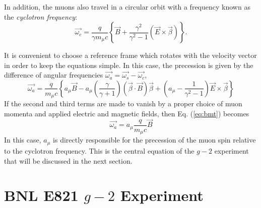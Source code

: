 \documentclass{outhesis}
\begin{document}
In addition, the muons also travel in a circular orbit with a frequency known as the \emph{cyclotron frequency}:
\begin{equation}
\overrightarrow{\omega_c} = \frac{q}{\gamma m_{\mu}c}\left\{\overrightarrow{B} + \frac{\gamma^2}{\gamma^2-1} \left(\overrightarrow{E} \times \overrightarrow{\beta}\right)\right\}.
\label{eq:c}
\end{equation}

It is convenient to choose a reference frame which rotates with the velocity vector in order to keep the equations simple. In this case, the precession is given by the difference of angular frequencies $\overrightarrow{\omega_a} = \overrightarrow{\omega_s} - \overrightarrow{\omega_c}$, 
\begin{equation}
\overrightarrow{\omega_a} =   \frac{q}{m_{\mu}c}\left\{a_{\mu}\overrightarrow{B}   -   a_{\mu}\left(\frac{\gamma}{\gamma + 1}\right)\left(\overrightarrow{\beta} \cdot \overrightarrow{B}\right)\overrightarrow{\beta} +   \left(a_{\mu}-\frac{1}{\gamma^2 - 1}\right)\overrightarrow{E} \times\overrightarrow{\beta}                 \right\}
\label{eq:bmt}
 \end{equation}
If the second and third terms are made to vanish by a proper choice of muon momenta and applied electric and magnetic fields, then Eq. (\ref{eq:bmt}) becomes
\begin{equation}
\overrightarrow{\omega_a} =   a_{\mu}\frac{q}{m_{\mu}c}\overrightarrow{B} 
\label{eq:wa}
\end{equation}
In this case, $a_{\mu}$ is directly responsible for the precession of the muon spin relative to the cyclotron frequency. This is the central equation of the $g-2$ experiment that will be discussed in the next section. 


\section{BNL E821 $g-2$ Experiment}
\end{document}
